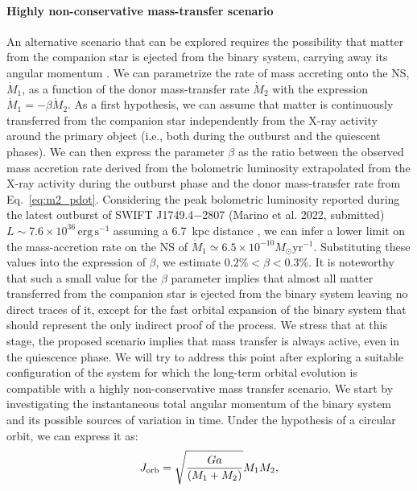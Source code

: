 \documentclass[fleqn,usenatbib]{mnras}
\newcommand{\swiftj}{SWIFT J1749.4$-$2807}
\begin{document}
\paragraph{Highly non-conservative mass-transfer scenario}
\label{sec:ncmt}
An alternative scenario that can be explored requires the possibility that matter from the companion star is ejected from the binary system, carrying away its angular momentum \citep[see e.g.,][for more details]{di-Salvo:2008uu,Burderi:2009td}. We can parametrize the rate of mass accreting onto the NS, $\dot{M}_1$, as a function of the donor mass-transfer rate $\dot{M}_2$ with the expression $\dot{M}_1=-\beta \dot{M}_2$. As a first hypothesis, we can assume that matter is continuously transferred from the companion star independently from the X-ray activity around the primary object (i.e., both during the outburst and the quiescent phases). We can then express the parameter $\beta$ as the ratio between the observed mass accretion rate derived from the bolometric luminosity extrapolated from the X-ray activity during the outburst phase and the donor mass-transfer rate from Eq.~\ref{eq:m2_pdot}. Considering the peak bolometric luminosity reported during the latest outburst of \swiftj{} (Marino et al. 2022, submitted) $L\sim7.6\times 10^{36}\,\text{erg}\,\text{s}^{-1}$ assuming a 6.7~kpc distance \citep{Wijnands:2009wa}, we can infer a lower limit on the mass-accretion rate on the NS of $\dot{M}_1\simeq6.5\times 10^{-10}{M}_{\odot} \text{yr}^{-1}$. Substituting these values into the expression of $\beta$, we estimate $0.2\%<\beta<0.3\%$. It is noteworthy that such a small value for the $\beta$ parameter implies that almost all matter transferred from the companion star is ejected from the binary system leaving no direct traces of it, except for the fast orbital expansion of the binary system that should represent the only indirect proof of the process. We stress that at this stage, the proposed scenario implies that mass transfer is always active, even in the quiescence phase. We will try to address this point after exploring a suitable configuration of the system  for which the long-term orbital evolution is compatible with a highly non-conservative mass transfer scenario. 
We start by investigating the instantaneous total angular momentum of the binary system and its possible sources of variation in time. Under the hypothesis of a circular orbit, we can express it as:
\begin{equation}
\label{eq:binarymoment}
J_{\rm orb}=\sqrt{\frac{Ga}{(M_1+M_2)}}M_1M_2,
\end{equation}
\end{document}
